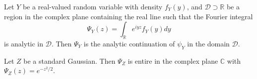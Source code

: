 \documentclass[10pt,a4paper]{amsart}
\begin{document}
\begin{definition}
    Let $Y$ be a real-valued random variable with density $f_Y(y)$, and $\mathcal{D}\supset\mathbb{R}$ be a region in the complex plane containing the real line such that the Fourier integral
    \begin{equation}\label{FourierIntegral}
        \Psi_Y(z) = \int_{\mathbb{R}}e^{iyz}f_Y(y)dy
    \end{equation}
    is analytic in $\mathcal{D}$. Then $\Psi_Y$ is the analytic continuation of $\psi_Y$ in the domain $\mathcal{D}$.
\end{definition}

\begin{lemma}\label{ExtendedGaussianCf}
    Let $Z$ be a standard Gaussian. Then $\Psi_Z$ is entire in the complex plane $\mathbb{C}$ with $\Psi_Z(z) = e^{-z^2/2}$.
\end{lemma}
\end{document}
